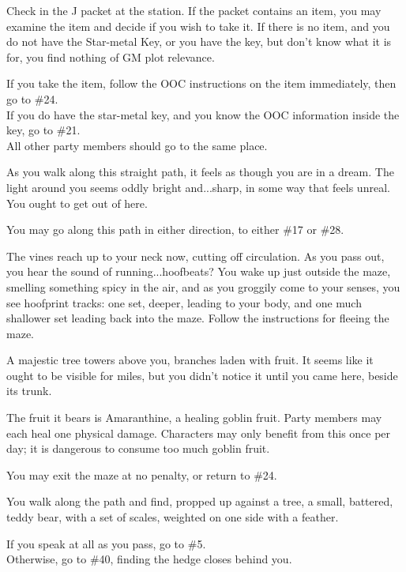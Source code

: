 \documentclass[white]{gl2018}
\begin{document}
\begin{large}
\begin{location}{39}
 Check in the J packet at the station.  If the packet contains an item, you may examine the item and decide if you wish to take it.  If there is no item, and you do not have the Star-metal Key, or you have the key, but don't know what it is for, you find nothing of GM plot relevance. 
\begin{fromhere}
If you take the item, follow the OOC instructions on the item immediately, then go to \#24.\\
If you do have the star-metal key, and you know the OOC information inside the key, go to \#21.
\\
All other party members should go to the same place.
\end{fromhere}
\end{location}
\begin{location}{40}
As you walk along this straight path, it feels as though you are in a dream.  The light around you seems oddly bright and...sharp, in some way that feels unreal.  You ought to get out of here.
\begin{fromhere}
You may go along this path in either direction, to either \#17 or \#28.
\end{fromhere}
\end{location}
\begin{location}{41}
The vines reach up to your neck now, cutting off circulation.  As you pass out, you hear the sound of running...hoofbeats?  You wake up just outside the maze, smelling something spicy in the air, and as you groggily come to your senses, you see hoofprint tracks: one set, deeper, leading to your body, and one much shallower set leading back into the maze.  Follow the instructions for fleeing the maze.
\end{location}
\begin{location}{42}
A majestic tree towers above you, branches laden with fruit.  It seems like it ought to be visible for miles, but you didn't notice it until you came here, beside its trunk.

The fruit it bears is Amaranthine, a healing goblin fruit.  Party members may each heal one physical damage.  Characters may only benefit from this once per day; it is dangerous to consume too much goblin fruit.
\begin{fromhere}
You may exit the maze at no penalty, or return to \#24.
\end{fromhere}
\end{location}
\begin{location}{43}
You walk along the path and find, propped up against a tree, a small, battered, teddy bear, with a set of scales, weighted on one side with a feather.
\begin{fromhere}
If you speak at all as you pass, go to \#5.\\
Otherwise, go to \#40, finding the hedge closes behind you.
\end{fromhere}
\end{location}
\begin{location}{44}


\end{location}
\end{large}
\end{document}
